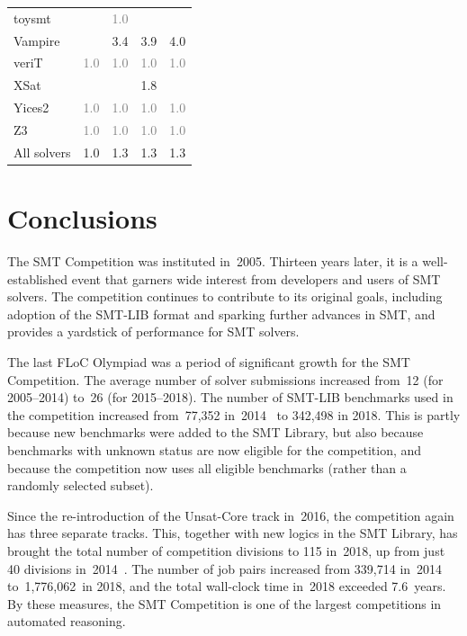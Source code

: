 \documentclass[dvipsnames,table,twoside,11pt]{article}
\begin{document}
\begin{table}
\begin{tabular}{lrrrr}
    toysmt            &     & \textcolor{gray}{1.0} &     &     \\
    Vampire           &     & 3.4 & 3.9 & 4.0 \\
    veriT             & \textcolor{gray}{1.0} & \textcolor{gray}{1.0} & \textcolor{gray}{1.0} & \textcolor{gray}{1.0} \\
    XSat              &     &     & 1.8 &     \\
    Yices2            & \textcolor{gray}{1.0} & \textcolor{gray}{1.0} & \textcolor{gray}{1.0} & \textcolor{gray}{1.0} \\
    Z3                & \textcolor{gray}{1.0} & \textcolor{gray}{1.0} & \textcolor{gray}{1.0} & \textcolor{gray}{1.0} \\
    \midrule
    All solvers       & 1.0 & 1.3 & 1.3 & 1.3 \\
    \bottomrule
  \end{tabular}
\end{table}


\section{Conclusions}
\label{sec:conclusions}

The SMT Competition was instituted in~2005.  Thirteen years later, it
is a well-established event that garners wide interest from developers
and users of SMT solvers.  The competition continues to contribute to
its original goals, including adoption of the SMT-LIB format and
sparking further advances in SMT, and provides a yardstick of
performance for SMT solvers.

The last FLoC Olympiad was a period of significant growth for the SMT
Competition.  The average number of solver submissions increased
from~12 (for 2005--2014) to~26 (for 2015--2018).  The number of
SMT-LIB benchmarks used in the competition increased from~77,352
in~2014~\cite{CDW14} to 342,498 in 2018.  This is partly because new
benchmarks were added to the SMT Library, but also because benchmarks
with unknown status are now eligible for the competition, and because
the competition now uses all eligible benchmarks (rather than a
randomly selected subset).

Since the re-introduction of the Unsat-Core track in~2016, the
competition again has three separate tracks.  This, together with new
logics in the SMT Library, has brought the total number of competition
divisions to 115 in~2018, up from just 40 divisions
in~2014~\cite{CDW14}.  The number of job pairs increased from 339,714
in~2014 to~1,776,062~in 2018, and the total wall-clock time in~2018
exceeded 7.6~years.  By these measures, the SMT Competition is one of
the largest competitions in automated reasoning.
\end{document}
